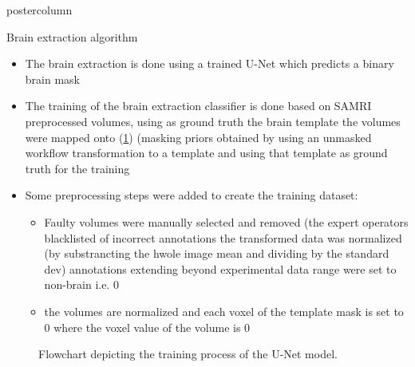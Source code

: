 \begin{frame}
\begin{columns}
\begin{column}{.42\textwidth}
\begin{beamercolorbox}[center]{postercolumn}
\begin{minipage}{.98\textwidth}
{%
                            \begin{myblock}{Brain extraction algorithm}
                                \begin{itemize}
                                    \item The brain extraction is done using a trained U-Net \cite{ronneberger_u-net:_2015} which predicts a binary brain mask
                                    \item The training of the brain extraction classifier is done based on \textcolor{lg}{SAMRI} preprocessed volumes, using as ground truth the brain template the volumes were mapped onto (\cref{training_graph}) (masking priors obtained by using an unmasked workflow transformation to a template and using that template as ground truth for the training
                                    \item Some preprocessing steps were added to create the training dataset:
                                    \begin{itemize}
                                        \item Faulty volumes were manually selected and removed (the expert operators blacklisted of incorrect annotations
                                            the transformed data was normalized (by substrancting the hwole image mean and dividing by the standard dev)
                                            annotations extending beyond experimental data range were set to non-brain i.e. 0
                                        \item the volumes are normalized and each voxel of the template mask is set to 0 where the voxel value of the volume is 0
                                    \end{itemize}
                                \end{itemize}

                                \begin{figure}
                                    \centering
                                    \caption{Flowchart depicting the training process of the U-Net model.}
                                    \label{training_graph}
                                \end{figure}


\end{myblock}}
\end{minipage}
\end{beamercolorbox}
\end{column}
\end{columns}
\end{frame}
